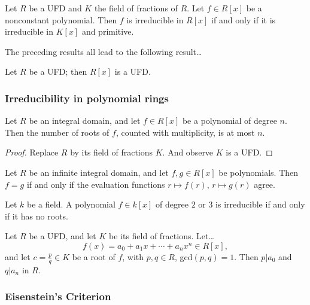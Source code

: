 \begin{corollary}
Let $R$ be a UFD and $K$ the field of fractions of $R$. Let $f \in R[x]$ be a nonconstant polynomial. Then $f$ is irreducible in $R[x]$ if and only if
it is irreducible in $K[x]$ and primitive.
\end{corollary}

\noindent The preceding results all lead to the following result\dots

\begin{theorem}
Let $R$ be a UFD; then $R[x]$ is a UFD.
\end{theorem}

\subsubsection{Irreducibility in polynomial rings}

\begin{lemma}
Let $R$ be an integral domain, and let $f \in R[x]$ be a polynomial of degree $n$. Then the number of roots of $f$, counted with multiplicity, is at most $n$.
\end{lemma}

\begin{proof}
Replace $R$ by its field of fractions $K$. And observe $K$ is a UFD.
\end{proof}

\begin{corollary}
Let $R$ be an infinite integral domain, and let $f,g \in R[x]$ be polynomials. Then $f = g$ if and only if the evaluation functions $r \mapsto f(r)$,
$r \mapsto g(r)$ agree.
\end{corollary}

\begin{proposition}
Let $k$ be a field. A polynomial $f \in k[x]$ of degree $2$ or $3$ is irreducible if and only if it has no roots.
\end{proposition}

\begin{proposition}
Let $R$ be a UFD, and let $K$ be its field of fractions. Let\dots
$$f(x) = a_0 + a_1 x + \cdots + a_n x^n \in R[x],$$
and let $c = \frac{p}{q} \in K$ be a root of $f$, with $p,q \in R$, gcd$(p,q) = 1$. Then $p | a_0$ and $q | a_n$ in $R$.
\end{proposition}

\subsubsection{Eisenstein's Criterion}

